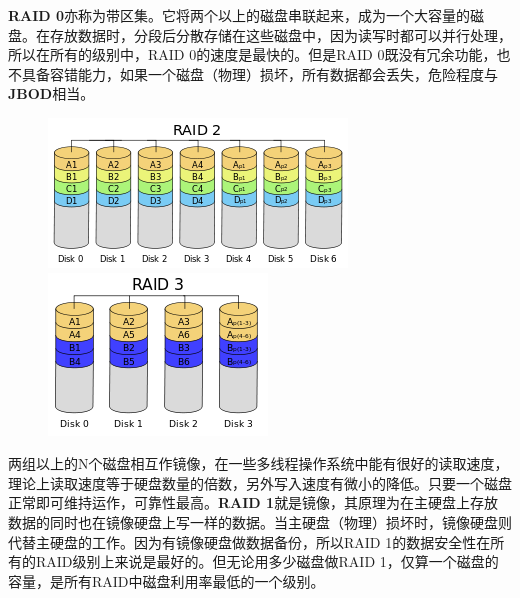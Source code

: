 \textbf{RAID 0}亦称为带区集。它将两个以上的磁盘串联起来，成为一个大容量的磁盘。在存放数据时，分段后分散存储在这些磁盘中，因为读写时都可以并行处理，所以在所有的级别中，RAID 0的速度是最快的。但是RAID 0既没有冗余功能，也不具备容错能力，如果一个磁盘（物理）损坏，所有数据都会丢失，危险程度与\textbf{JBOD}相当。


\begin{figure}[ht]
	\begin{center}
		\includegraphics[keepaspectratio,width=0.2\paperwidth]{Pictures/RAID/RAID2.png}
		\includegraphics[keepaspectratio,width=0.2\paperwidth]{Pictures/RAID/RAID3.png}
	\end{center}
\end{figure}

两组以上的N个磁盘相互作镜像，在一些多线程操作系统中能有很好的读取速度，理论上读取速度等于硬盘数量的倍数，另外写入速度有微小的降低。只要一个磁盘正常即可维持运作，可靠性最高。\textbf{RAID 1}就是镜像，其原理为在主硬盘上存放数据的同时也在镜像硬盘上写一样的数据。当主硬盘（物理）损坏时，镜像硬盘则代替主硬盘的工作。因为有镜像硬盘做数据备份，所以RAID 1的数据安全性在所有的RAID级别上来说是最好的。但无论用多少磁盘做RAID 1，仅算一个磁盘的容量，是所有RAID中磁盘利用率最低的一个级别。

